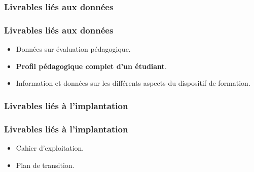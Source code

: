 					\subsubsection{Livrables liés aux données} 
							\begin{frame}
							\frametitle{Livrables liés aux données}
                        			
							\begin{itemize}
							
							\item Données sur évaluation pédagogique.
							\item \textbf{Profil pédagogique complet d’un étudiant}.
							\item Information et données sur les différents aspects du dispositif de formation.
								
							\end{itemize}						
					\end{frame}
					
					\subsubsection{Livrables liés à l'implantation} 
							\begin{frame}
							\frametitle{Livrables liés à l'implantation}
                        			
							\begin{itemize}
							
							\item Cahier d’exploitation.
							\item Plan de transition.
								
							\end{itemize}						
					\end{frame}
					
					
